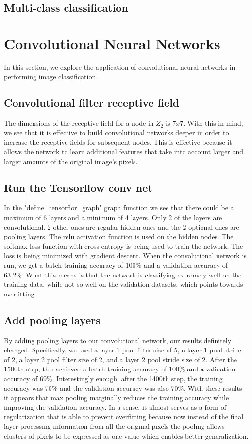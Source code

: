\documentclass{article}
\begin{document}
\subsection{Multi-class classification}



\section{Convolutional Neural Networks}
In this section, we explore the application of convolutional neural networks in performing image classification.

\subsection{Convolutional filter receptive field}
The dimensions of the receptive field for a node in $Z_2$ is $7 x 7$. With this in mind, we see that it is effective to build convolutional networks deeper in order to increase the receptive fields for subsequent nodes. This is effective because it allows the network to learn additional features that take into account larger and larger amounts of the original image's pixels.

\subsection{Run the Tensorflow conv net}
In the "define\_tensorflor\_graph" graph function we see that there could be a maximum of 6 layers and a minimum of 4 layers. Only 2 of the layers are convolutional. 2 other ones are regular hidden ones and the 2 optional ones are pooling layers. The relu activation function is used on the hidden nodes. The softmax loss function with cross entropy is being used to train the network. The loss is being minimized with gradient descent. When the convolutional network is run, we get a batch training accuracy of 100\% and a validation accuracy of 63.2\%. What this means is that the network is classifying extremely well on the training data, while not so well on the validation datasets, which points towards overfitting.

\subsection{Add pooling layers}
By adding pooling layers to our convolutional network, our results definitely changed. Specifically, we used a layer 1 pool filter size of 5, a layer 1 pool stride of 2, a layer 2 pool filter size of 2, and a layer 2 pool stride size of 2. After the 1500th step, this achieved a batch training accuracy of 100\% and a validation accuracy of 69\%. Interestingly enough, after the 1400th step, the training accuracy was 70\% and the validation accuracy was also 70\%. With these results it appears that max pooling marginally reduces the training accuracy while improving the validation accuracy. In a sense, it almost serves as a form of regularization that is able to prevent overfitting because now instead of the final layer processing information from all the original pixels the pooling allows clusters of pixels to be expressed as one value which enables better generalization.
\end{document}
